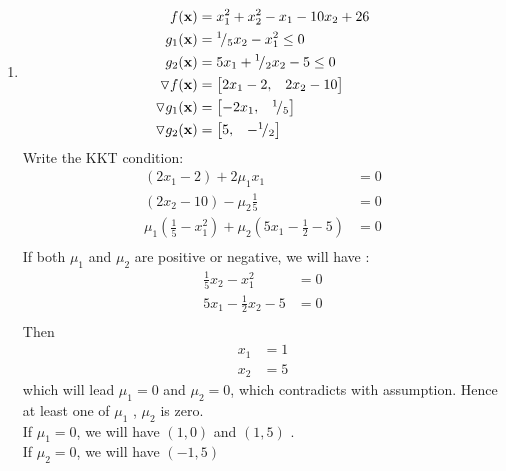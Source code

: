 \documentclass{article}
\newcommand*\rfrac[2]{{}^{#1}\!/_{#2}}
\begin{document}
\begin{enumerate} [label=(\alph*)] 

\item 
\begin{align*} 
f(\vx) & = x_1^2 + x_2^2 -x_1 - 10x_2 + 26 \\
g_1 (\vx)  &=  \rfrac{1}{5} x_2 -x_1^2  \leq 0 \\
g_2(\vx) & =  5x_1+\rfrac{1}{2}x_2 - 5 \leq 0 \\
\triangledown f(\vx) &= \bmat{2x_1 - 2,  & 2x_2-10} \\
\triangledown g_1(\vx) &= \bmat{-2x_1, & \rfrac{1}{5} } \\
\triangledown g_2(\vx) &= \bmat{ 5, & -\rfrac{1}{2}} 
\end{align*} 
Write the KKT condition: 
\begin{align*} 
(2x_1-2) +2 \mu_1 x_1 &= 0 \\
(2x_2-10) - \mu_2 \frac{1}{5} & = 0 \\
\mu_1 (\frac{1}{5} -x_1^2 ) + \mu_2(5x_1-\frac{1}{2} - 5) & = 0 \\
\end{align*} 
If both $\mu_1 $ and $\mu_2 $ are positive or negative, we will have : \begin{align*} 
\frac{1}{5} x_2 -x_1^2 & = 0\\
5x_1 -\frac{1}{2}x_2 -5 & = 0\\
\end{align*} 
Then \begin{align*} 
x_1 &= 1 \\
x_2 &= 5 
\end{align*}
which will lead $\mu_1 = 0 $ and $ \mu_2 = 0 $, which contradicts with assumption. Hence at least one of $\mu_1$ , $\mu_2$ is zero. \\
If $\mu_1=0 $, we will have $(1, 0) $ and $ (1, 5) $ . \\
If $\mu_2=0 $, we will have $(-1, 5) $ 


\end{enumerate}
\end{document}
